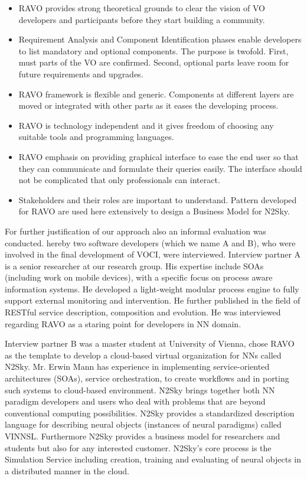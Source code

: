 \documentclass[]{article}
\begin{document}
\begin{itemize}
\item RAVO provides strong theoretical grounds to clear the vision of VO developers and participants before they start building a community.
\item Requirement Analysis and Component Identification phases enable developers to list mandatory and optional components. The purpose is twofold. First, must parts of the VO are confirmed. Second, optional parts leave room for future requirements and upgrades.
\item RAVO framework is flexible and generic. Components at different layers are moved or integrated with other parts as it eases the developing process.
\item RAVO is technology independent and it gives freedom of choosing any suitable tools and programming languages.
\item RAVO emphasis on providing graphical interface to ease the end user so that they can communicate and formulate their queries easily. The interface should not be complicated that only professionals can interact.
    \item Stakeholders and their roles are important to understand. Pattern developed for RAVO are used here extensively to design a Business Model for N2Sky.
\end{itemize}


For further justification of our approach also an informal evaluation was conducted. hereby two software developers (which we name A and B), who were involved in the final development of VOCI, were interviewed.
Interview partner A is a senior researcher at our research group. His expertise include SOAs (including work on mobile devices), with a specific focus on process aware information systems. He developed a light-weight modular process engine to fully support external monitoring and intervention. He further published in the field of RESTful service description, composition and evolution. He was interviewed regarding RAVO as a staring point for developers in NN domain.

Interview partner B was a master student at University of Vienna, chose RAVO as the template to develop a cloud-based virtual organization for NNs called N2Sky. Mr. Erwin Mann has experience in implementing service-oriented architectures (SOAs), service orchestration, to create workflows and in porting such systems to cloud-based environment.
N2Sky brings together both NN paradigm developers and users who deal with problems that are beyond conventional computing possibilities. N2Sky provides a standardized description language for describing neural objects (instances of neural paradigms) called VINNSL. Furthermore N2Sky provides a business model for researchers and students but also for any interested customer. N2Sky's core process is the Simulation Service including creation, training and evaluating of neural objects in a distributed manner in the cloud.
\end{document}
